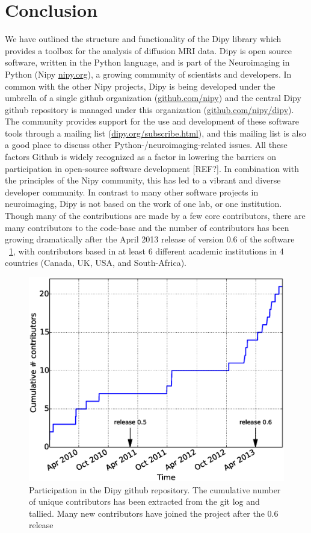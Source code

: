 \documentclass{bioinfo}
\begin{document}
\section{Conclusion}

We have outlined the structure and functionality of the Dipy library
which provides a toolbox for the analysis of diffusion MRI data. Dipy is
open source software, written in the Python language, and is part of the Neuroimaging in Python 
(Nipy \url{nipy.org}), a growing
community of scientists and developers. 
In common with the other Nipy projects, Dipy is being developed under the
umbrella of a single github organization (\url{github.com/nipy}) and the central
Dipy github repository is managed under this organization
(\url{github.com/nipy/dipy}).  The community provides support for the use and
development of these software tools through a mailing list
(\url{dipy.org/subscribe.html}), and this mailing
list is also a good place to discuss other Python-/neuroimaging-related issues.
All these factors 
Github is widely recognized as a factor in lowering the barriers on
participation in open-source software development [REF?]. In combination with
the principles of the Nipy community, this has led to a vibrant and diverse
developer community. In contrast to many other software projects in
neuroimaging, Dipy is not based on the work of one lab, or one institution. Though
many of the contributions are made by a few core contributors, there are many
contributors to the code-base and the number of contributors has been growing
dramatically after the April 2013 release of version 0.6 of the software
~\ref{Fig:gh_stats}, with contributors based in at least 6 different academic
institutions in 4 countries (Canada, UK, USA, and South-Africa).

\begin{figure}
\centering{}
\includegraphics[scale=0.37]{Figures/fig-gh.eps}
\caption{Participation in the Dipy github repository. The cumulative number of
  unique contributors has been extracted from the git log and tallied. Many
  new contributors have joined the project after the 0.6 release\label{Fig:gh_stats}}
\end{figure}
\end{document}
